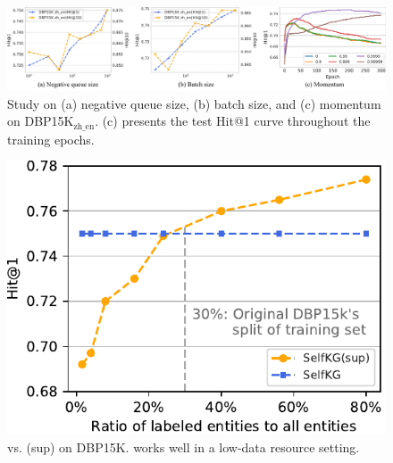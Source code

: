 \begin{figure}[t]
    \centering
    \setlength{\abovecaptionskip}{2mm}
    \centering
    \includegraphics[width=.98\linewidth]{img/selfkg_ablation.pdf}
    \caption{Study on (a) negative queue size, (b) batch size, and (c) momentum on DBP15K$_{\text{zh\_en}}$. (c) presents the test Hit@1 curve throughout the training epochs.}
    \label{fig:size_study}
\end{figure}

\begin{figure}
    \centering
        \setlength{\abovecaptionskip}{2mm}
        \includegraphics[width=0.9\linewidth]{img/sup.pdf}
        \caption{\solution vs. \solution(sup) on DBP15K. \textmd{\solution works well in a low-data resource setting.}}
        \label{fig:sup}
        \vspace{-0.4cm}
\end{figure}
